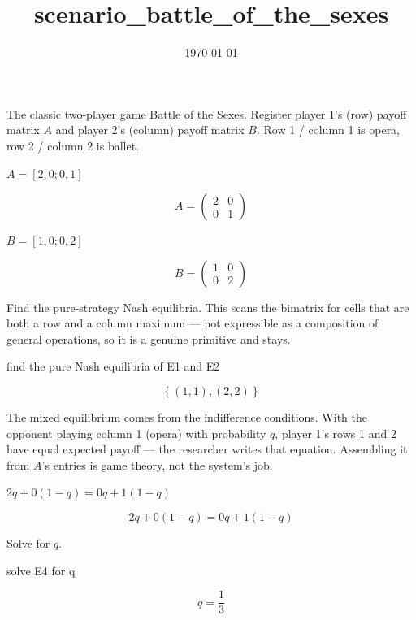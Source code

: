 \documentclass[dvipdfmx]{article}
\title{scenario\_battle\_of\_the\_sexes}
\date{\today}
\begin{document}
\maketitle

The classic two-player game Battle of the Sexes. Register player 1's (row) payoff matrix $A$ and player 2's (column) payoff matrix $B$. Row 1 / column 1 is opera, row 2 / column 2 is ballet.

$A = [2, 0; 0, 1]$

\begin{equation}
  A = \begin{pmatrix} 2 & 0 \\ 0 & 1 \end{pmatrix}
  \label{eq:E1}
\end{equation}

$B = [1, 0; 0, 2]$

\begin{equation}
  B = \begin{pmatrix} 1 & 0 \\ 0 & 2 \end{pmatrix}
  \label{eq:E2}
\end{equation}

Find the pure-strategy Nash equilibria. This scans the bimatrix for cells that are both a row and a column maximum — not expressible as a composition of general operations, so it is a genuine primitive and stays.

find the pure Nash equilibria of E1 and E2

\begin{equation}
  \left\{ \left( 1 , 1 \right) , \left( 2 , 2 \right) \right\}
  \label{eq:E3}
\end{equation}

The mixed equilibrium comes from the indifference conditions. With the opponent playing column 1 (opera) with probability $q$, player 1's rows 1 and 2 have equal expected payoff — the researcher writes that equation. Assembling it from $A$'s entries is game theory, not the system's job.

$2 q + 0 (1-q) = 0 q + 1 (1-q)$

\begin{equation}
  2 q + 0 (1-q) = 0 q + 1 (1-q)
  \label{eq:E4}
\end{equation}

Solve for $q$.

solve E4 for q

\begin{equation}
  q = \frac{1}{3}
  \label{eq:E5}
\end{equation}
\end{document}
